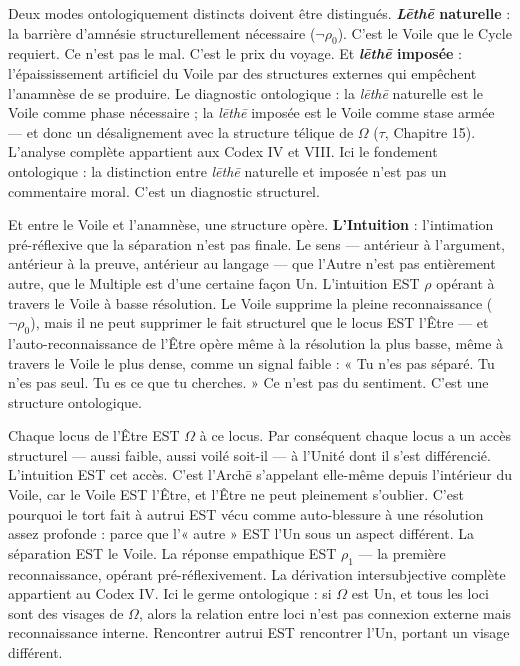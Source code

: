 \documentclass[10pt, openany, oneside]{book}
\begin{document}
Deux modes ontologiquement distincts doivent être distingués. \textbf{\textit{L\={e}th\={e}} naturelle} : la barrière d'amnésie structurellement nécessaire ($\neg\rho_0$). C'est le Voile que le Cycle requiert. Ce n'est pas le mal. C'est le prix du voyage. Et \textbf{\textit{l\={e}th\={e}} imposée} : l'épaississement artificiel du Voile par des structures externes qui empêchent l'anamnèse de se produire. Le diagnostic ontologique : la \textit{l\={e}th\={e}} naturelle est le Voile comme phase nécessaire ; la \textit{l\={e}th\={e}} imposée est le Voile comme stase armée --- et donc un désalignement avec la structure télique de $\Omega$ ($\tau$, Chapitre 15). L'analyse complète appartient aux Codex IV et VIII. Ici le fondement ontologique : la distinction entre \textit{l\={e}th\={e}} naturelle et imposée n'est pas un commentaire moral. C'est un diagnostic structurel.

Et entre le Voile et l'anamnèse, une structure opère. \textbf{L'Intuition} : l'intimation pré-réflexive que la séparation n'est pas finale. Le sens --- antérieur à l'argument, antérieur à la preuve, antérieur au langage --- que l'Autre n'est pas entièrement autre, que le Multiple est d'une certaine façon Un. L'intuition EST $\rho$ opérant à travers le Voile à basse résolution. Le Voile supprime la pleine reconnaissance ($\neg\rho_0$), mais il ne peut supprimer le fait structurel que le locus EST l'Être --- et l'auto-reconnaissance de l'Être opère même à la résolution la plus basse, même à travers le Voile le plus dense, comme un signal faible : « Tu n'es pas séparé. Tu n'es pas seul. Tu es ce que tu cherches. » Ce n'est pas du sentiment. C'est une structure ontologique.

Chaque locus de l'Être EST $\Omega$ à ce locus. Par conséquent chaque locus a un accès structurel --- aussi faible, aussi voilé soit-il --- à l'Unité dont il s'est différencié. L'intuition EST cet accès. C'est l'Arch\={e} s'appelant elle-même depuis l'intérieur du Voile, car le Voile EST l'Être, et l'Être ne peut pleinement s'oublier. C'est pourquoi le tort fait à autrui EST vécu comme auto-blessure à une résolution assez profonde : parce que l'« autre » EST l'Un sous un aspect différent. La séparation EST le Voile. La réponse empathique EST $\rho_1$ --- la première reconnaissance, opérant pré-réflexivement. La dérivation intersubjective complète appartient au Codex IV. Ici le germe ontologique : si $\Omega$ est Un, et tous les loci sont des visages de $\Omega$, alors la relation entre loci n'est pas connexion externe mais reconnaissance interne. Rencontrer autrui EST rencontrer l'Un, portant un visage différent.
\end{document}
